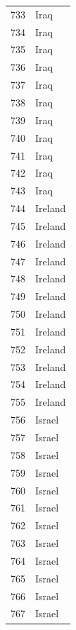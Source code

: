 \documentclass[
  letterpaper,
  DIV=11,
  numbers=noendperiod]{scrreprt}
\begin{document}
\begin{tabular}{ll}
733  &                      Iraq \\
734  &                      Iraq \\
735  &                      Iraq \\
736  &                      Iraq \\
737  &                      Iraq \\
738  &                      Iraq \\
739  &                      Iraq \\
740  &                      Iraq \\
741  &                      Iraq \\
742  &                      Iraq \\
743  &                      Iraq \\
744  &                   Ireland \\
745  &                   Ireland \\
746  &                   Ireland \\
747  &                   Ireland \\
748  &                   Ireland \\
749  &                   Ireland \\
750  &                   Ireland \\
751  &                   Ireland \\
752  &                   Ireland \\
753  &                   Ireland \\
754  &                   Ireland \\
755  &                   Ireland \\
756  &                    Israel \\
757  &                    Israel \\
758  &                    Israel \\
759  &                    Israel \\
760  &                    Israel \\
761  &                    Israel \\
762  &                    Israel \\
763  &                    Israel \\
764  &                    Israel \\
765  &                    Israel \\
766  &                    Israel \\
767  &                    Israel \\

\end{tabular}
\end{document}
